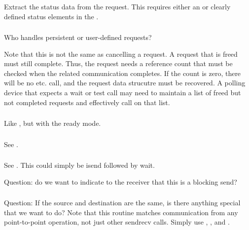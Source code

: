 \documentclass{article}
\begin{document}
\subsubsection{}
Extract the status data from the request.
This requires either an  or clearly defined
status elements in the .

\subsubsection{}
\begin{adi3}
\begin{mmadi}
\begin{core}
\end{core}
\end{mmadi}
\end{adi3}
Who handles persistent or user-defined requests?

Note that this is not the same as cancelling a request.  
A request that is freed must still complete.  Thus, the request needs
a reference count that must be checked when the related communication
completes.  If the count is zero, there will be no 
etc. call, and the request data strucutre must be recovered.  A
polling device that expects a wait or test call may need to maintain a
list of freed but not completed requests and effectively call
 on that list.

\subsubsection{}
Like , but with the ready mode.

\subsubsection{}
See .

\subsubsection{}
See .  This could simply be isend followed by wait.

Question: do we want to indicate to the receiver that this is a
blocking send?

\subsubsection{}
Question: If the source and destination are the same, is there anything
special that we want to do?  Note that this routine matches communication from
any point-to-point operation, not just other sendrecv calls.  
Simply use , , and
. 
\end{document}
